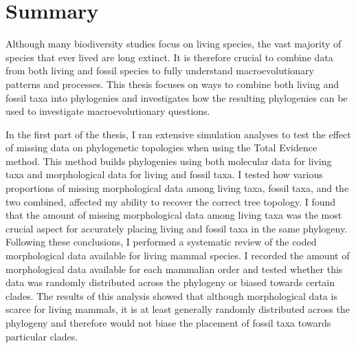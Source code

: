 \chapter*{Summary}
Although many biodiversity studies focus on living species, the vast majority of species that ever lived are long extinct.
It is therefore crucial to combine data from both living and fossil species to fully understand macroevolutionary patterns and processes.
This thesis focuses on ways to combine both living and fossil taxa into phylogenies and investigates how the resulting phylogenies can be used to investigate macroevolutionary questions.

In the first part of the thesis, I ran extensive simulation analyses to test the effect of missing data on phylogenetic topologies when using the Total Evidence method.
This method builds phylogenies using both molecular data for living taxa and morphological data for living and fossil taxa.
I tested how various proportions of missing morphological data among living taxa, fossil taxa, and the two combined, affected my ability to recover the correct tree topology.
I found that the amount of missing morphological data among living taxa was the most crucial aspect for accurately placing living and fossil taxa in the same phylogeny.
Following these conclusions, I performed a systematic review of the coded morphological data available for living mammal species.
I recorded the amount of morphological data available for each mammalian order and tested whether this data was randomly distributed across the phylogeny or biased towards certain clades.
The results of this analysis showed that although morphological data is scarce for living mammals, it is at least generally randomly distributed across the phylogeny and therefore would not biase the placement of fossil taxa towards particular clades. %

